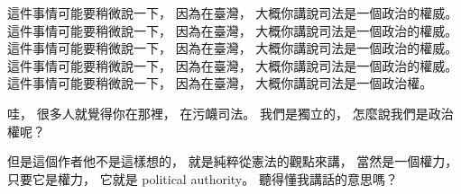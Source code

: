 \hypertarget{w02:cue:1190}{}這件事情可能要稍微說一下，
\hypertarget{w02:cue:1191}{}因為在臺灣，
\hypertarget{w02:cue:1192}{}大概你講說司法是一個政治的權威。
\hypertarget{w02:cue:1193}{}這件事情可能要稍微說一下，
\hypertarget{w02:cue:1194}{}因為在臺灣，
\hypertarget{w02:cue:1195}{}大概你講說司法是一個政治的權威。
\hypertarget{w02:cue:1196}{}這件事情可能要稍微說一下，
\hypertarget{w02:cue:1197}{}因為在臺灣，
\hypertarget{w02:cue:1198}{}大概你講說司法是一個政治的權威。
\hypertarget{w02:cue:1199}{}這件事情可能要稍微說一下，
\hypertarget{w02:cue:1200}{}因為在臺灣，
\hypertarget{w02:cue:1201}{}大概你講說司法是一個政治的權威。
\hypertarget{w02:cue:1202}{}這件事情可能要稍微說一下，
\hypertarget{w02:cue:1203}{}因為在臺灣，
\hypertarget{w02:cue:1204}{}大概你講說司法是一個政治權。

\hypertarget{w02:cue:1205}{}哇，
\hypertarget{w02:cue:1206}{}很多人就覺得你在那裡，
\hypertarget{w02:cue:1207}{}在污衊司法。
\hypertarget{w02:cue:1208}{}我們是獨立的，
\hypertarget{w02:cue:1209}{}怎麼說我們是政治權呢？

\hypertarget{w02:cue:1210}{}但是這個作者他不是這樣想的，
\hypertarget{w02:cue:1211}{}就是純粹從憲法的觀點來講，
\hypertarget{w02:cue:1212}{}當然是一個權力，
\hypertarget{w02:cue:1213}{}只要它是權力，
\hypertarget{w02:cue:1214}{}它就是 political authority。
\hypertarget{w02:cue:1215}{}聽得懂我講話的意思嗎？

